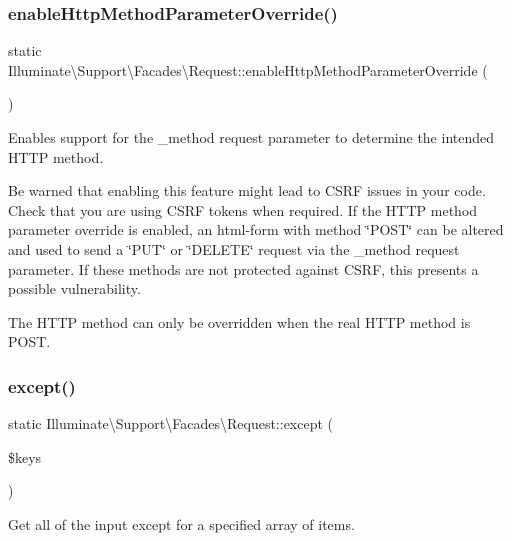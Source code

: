 \subsubsection{\texorpdfstring{enable\+Http\+Method\+Parameter\+Override()}{enableHttpMethodParameterOverride()}}
{\footnotesize\ttfamily static Illuminate\textbackslash{}\+Support\textbackslash{}\+Facades\textbackslash{}\+Request\+::enable\+Http\+Method\+Parameter\+Override (\begin{DoxyParamCaption}{ }\end{DoxyParamCaption})\hspace{0.3cm}{\ttfamily [static]}}

Enables support for the \+\_\+method request parameter to determine the intended H\+T\+TP method.

Be warned that enabling this feature might lead to C\+S\+RF issues in your code. Check that you are using C\+S\+RF tokens when required. If the H\+T\+TP method parameter override is enabled, an html-\/form with method \char`\"{}\+P\+O\+S\+T\char`\"{} can be altered and used to send a \char`\"{}\+P\+U\+T\char`\"{} or \char`\"{}\+D\+E\+L\+E\+T\+E\char`\"{} request via the \+\_\+method request parameter. If these methods are not protected against C\+S\+RF, this presents a possible vulnerability.

The H\+T\+TP method can only be overridden when the real H\+T\+TP method is P\+O\+ST. \mbox{\label{class_illuminate_1_1_support_1_1_facades_1_1_request_ae1911ce30adfca2e337178dff9fa40e6}} 
\subsubsection{\texorpdfstring{except()}{except()}}
{\footnotesize\ttfamily static Illuminate\textbackslash{}\+Support\textbackslash{}\+Facades\textbackslash{}\+Request\+::except (\begin{DoxyParamCaption}\item[{}]{\$keys }\end{DoxyParamCaption})\hspace{0.3cm}{\ttfamily [static]}}

Get all of the input except for a specified array of items.


